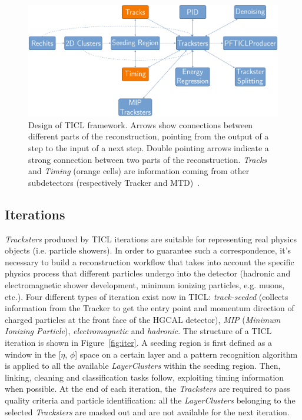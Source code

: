 \begin{figure}[tbp]
    \centering %
    \includegraphics[width=.9\textwidth]{chapters/HGCal/figures/chef/ticl.pdf} 
    \caption{\label{fig:ticl} Design of TICL framework. Arrows show connections between different parts of the reconstruction, pointing from the output of a step to the input of a next step. Double pointing arrows indicate a strong connection between two parts of the reconstruction. \emph{Tracks} and \emph{Timing} (orange cells) are information coming from other subdetectors (respectively Tracker and MTD)~\cite{ticlwebsite}.}
\end{figure}


\subsection{Iterations}
\label{sec:iter}

\emph{Tracksters} produced by TICL iterations are suitable for representing real physics objects (i.e. particle showers). In order to guarantee such a correspondence, it's necessary to build a reconstruction workflow that takes into account the specific physics process that different particles undergo into the detector (hadronic and electromagnetic shower development, minimum ionizing particles, e.g. muons, etc.). Four different types of iteration exist now in TICL: \emph{track-seeded} (collects information from the Tracker to get the entry point and momentum direction of charged particles at the front face of the HGCAL detector), \emph{MIP} (\emph{Minimum Ionizing Particle}), \emph{electromagnetic} and \emph{hadronic}. The structure of a TICL iteration is shown in Figure~\ref{fig:iter}. A seeding region is first defined as a window in the [$\eta$, $\phi$] space on a certain layer and a pattern recognition algorithm is applied to all the available \emph{LayerClusters} within the seeding region. Then, linking, cleaning and classification tasks follow, exploiting timing information when possible. At the end of each iteration, the \emph{Tracksters} are required to pass quality criteria and particle identification: all the \emph{LayerClusters} belonging to the selected \emph{Tracksters} are masked out and are not available for the next iteration.

